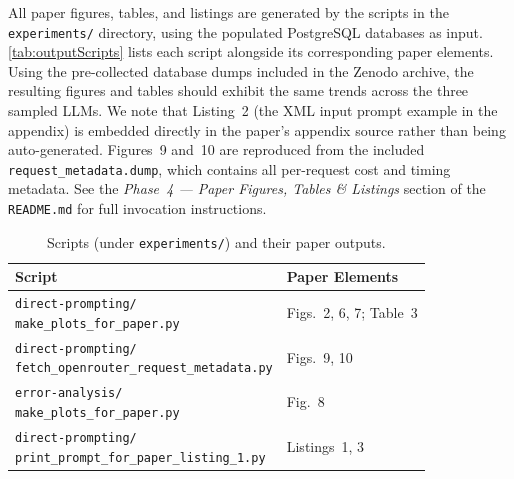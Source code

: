 \documentclass[conference]{IEEEtran}
\begin{document}
\artout
All paper figures, tables, and listings are generated by the scripts in the \texttt{experiments/} directory, using the populated PostgreSQL databases as input.
\autoref{tab:outputScripts} lists each script alongside its corresponding paper elements.
Using the pre-collected database dumps included in the Zenodo archive, the resulting figures and tables should exhibit the same trends across the three sampled LLMs.
We note that Listing~2 (the XML input prompt example in the appendix) is embedded directly in the paper's appendix source rather than being auto-generated.
Figures~9 and~10 are reproduced from the included \texttt{request\_metadata.dump}, which contains all per-request cost and timing metadata.
See the \textit{Phase~4 --- Paper Figures, Tables \& Listings} section of the \texttt{README.md} for full invocation instructions.

\begin{table}
\centering
\caption{Scripts (under \texttt{experiments/}) and their paper outputs.}
\label{tab:outputScripts}
\scriptsize
\begin{tabular}{@{}ll@{}}
\toprule
Script & Paper Elements \\
\midrule
\shortstack[l]{\texttt{direct-prompting/}\\\texttt{make\_plots\_for\_paper.py}}                & Figs.\ 2, 6, 7; Table~3 \\[4pt]
\shortstack[l]{\texttt{direct-prompting/}\\\texttt{fetch\_openrouter\_request\_metadata.py}}   & Figs.\ 9, 10 \\[4pt]
\shortstack[l]{\texttt{error-analysis/}\\\texttt{make\_plots\_for\_paper.py}}                  & Fig.\ 8 \\[4pt]
\shortstack[l]{\texttt{direct-prompting/}\\\texttt{print\_prompt\_for\_paper\_listing\_1.py}}  & Listings~1, 3 \\
\bottomrule
\end{tabular}
\end{table}
\end{document}
